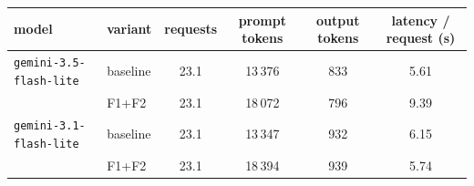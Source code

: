 \begin{tabular}{llcccc}
\toprule
model & variant & requests & prompt tokens & output tokens & latency / request (s) \\
\midrule
\texttt{gemini-3.5-flash-lite} & baseline & 23.1 & 13\,376 & 833 & 5.61 \\
 & F1+F2 & 23.1 & 18\,072 & 796 & 9.39 \\
\texttt{gemini-3.1-flash-lite} & baseline & 23.1 & 13\,347 & 932 & 6.15 \\
 & F1+F2 & 23.1 & 18\,394 & 939 & 5.74 \\
\bottomrule
\end{tabular}
